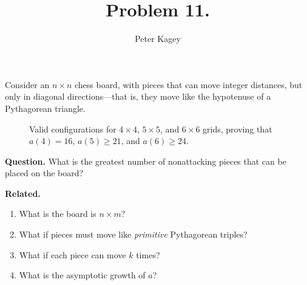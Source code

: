 \documentclass{article}
\newenvironment{question}{\begin{trivlist}\item[\textbf{Question.}]}{\end{trivlist}}
\newenvironment{related}{\begin{trivlist}\item[\textbf{Related.}]\end{trivlist}\begin{enumerate}}{\end{enumerate}}
\begin{document}
\title{Problem 11.}
\date{}
\author{Peter Kagey}
\maketitle
  Consider an $n \times n$ chess board, with pieces that can move integer
  distances, but only in diagonal directions---that is, they move like the
  hypotenuse of a Pythagorean triangle.
\begin{figure}[!h]
  \centering
   \hspace{1cm}
   \hspace{1cm}
   \hspace{1cm}
  \caption{
    Valid configurations for $4 \times 4$, $5 \times 5$, and $6 \times 6$ grids,
    proving that $a(4) = 16$, $a(5) \geq 21$, and $a(6) \geq 24$.}
\end{figure}

\begin{question}
  What is the greatest number of nonattacking pieces that can be placed on the board?
\end{question}

\begin{related}
  \item What is the board is $n \times m$?
  \item What if pieces must move like \textit{primitive} Pythagorean triples?
  \item What if each piece can move $k$ times?
  \item What is the asymptotic growth of $a$?
\end{related}
\end{document}
